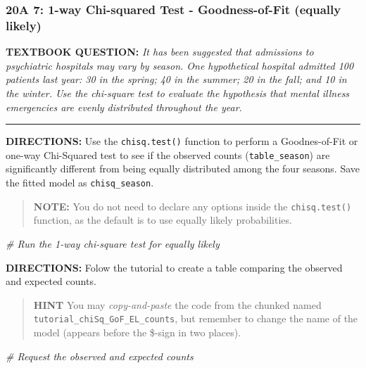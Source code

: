 \documentclass[
]{article}
\newenvironment{Shaded}{\begin{snugshade}}{\end{snugshade}}
\newcommand{\CommentTok}[1]{\textcolor[rgb]{0.56,0.35,0.01}{\textit{#1}}}
\begin{document}
\hypertarget{a-7-1-way-chi-squared-test---goodness-of-fit-equally-likely}{%
\subsubsection{20A 7: 1-way Chi-squared Test - Goodness-of-Fit (equally
likely)}\label{a-7-1-way-chi-squared-test---goodness-of-fit-equally-likely}}

\textbf{TEXTBOOK QUESTION:} \emph{It has been suggested that admissions
to psychiatric hospitals may vary by season. One hypothetical hospital
admitted 100 patients last year: 30 in the spring; 40 in the summer; 20
in the fall; and 10 in the winter. Use the chi-square test to evaluate
the hypothesis that mental illness emergencies are evenly distributed
throughout the year.}

\begin{center}\rule{0.5\linewidth}{0.5pt}\end{center}

\textbf{DIRECTIONS:} Use the \texttt{chisq.test()} function to perform a
Goodnes-of-Fit or one-way Chi-Squared test to see if the observed counts
(\texttt{table\_season}) are significantly different from being equally
distributed among the four seasons. Save the fitted model as
\texttt{chisq\_season}.

\begin{quote}
\textbf{NOTE:} You do not need to declare any options inside the
\texttt{chisq.test()} function, as the default is to use equally likely
probabilities.
\end{quote}

\begin{Shaded}
\begin{Highlighting}[]
\CommentTok{\# Run the 1{-}way chi{-}square test for equally likely}
\end{Highlighting}
\end{Shaded}

\textbf{DIRECTIONS:} Folow the tutorial to create a table comparing the
observed and expected counts.

\begin{quote}
\textbf{HINT} You may \emph{copy-and-paste} the code from the chunked
named \texttt{tutorial\_chiSq\_GoF\_EL\_counts}, but remember to change
the name of the model (appears before the \$-sign in two places).
\end{quote}

\begin{Shaded}
\begin{Highlighting}[]
\CommentTok{\# Request the observed and expected counts}
\end{Highlighting}
\end{Shaded}
\end{document}
